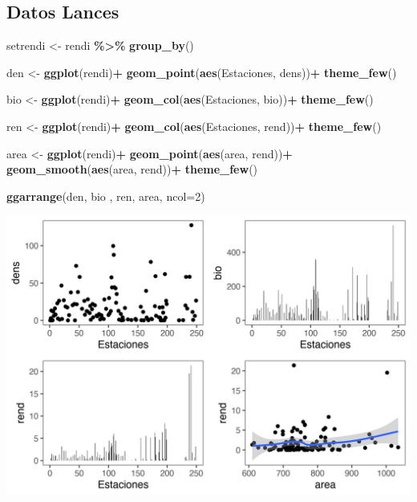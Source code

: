 \documentclass[
]{article}
\newenvironment{Shaded}{\begin{snugshade}}{\end{snugshade}}
\newcommand{\AttributeTok}[1]{\textcolor[rgb]{0.13,0.29,0.53}{#1}}
\newcommand{\DecValTok}[1]{\textcolor[rgb]{0.00,0.00,0.81}{#1}}
\newcommand{\FunctionTok}[1]{\textcolor[rgb]{0.13,0.29,0.53}{\textbf{#1}}}
\newcommand{\NormalTok}[1]{#1}
\newcommand{\OtherTok}[1]{\textcolor[rgb]{0.56,0.35,0.01}{#1}}
\newcommand{\SpecialCharTok}[1]{\textcolor[rgb]{0.81,0.36,0.00}{\textbf{#1}}}
\begin{document}
\hypertarget{datos-lances}{%
\subsection{Datos Lances}\label{datos-lances}}

\begin{Shaded}
\begin{Highlighting}[]
\NormalTok{setrendi }\OtherTok{\textless{}{-}}\NormalTok{ rendi }\SpecialCharTok{\%\textgreater{}\%} 
  \FunctionTok{group\_by}\NormalTok{()}

\NormalTok{den }\OtherTok{\textless{}{-}} \FunctionTok{ggplot}\NormalTok{(rendi)}\SpecialCharTok{+}
  \FunctionTok{geom\_point}\NormalTok{(}\FunctionTok{aes}\NormalTok{(Estaciones, dens))}\SpecialCharTok{+}
  \FunctionTok{theme\_few}\NormalTok{()}

\NormalTok{bio }\OtherTok{\textless{}{-}} \FunctionTok{ggplot}\NormalTok{(rendi)}\SpecialCharTok{+}
  \FunctionTok{geom\_col}\NormalTok{(}\FunctionTok{aes}\NormalTok{(Estaciones, bio))}\SpecialCharTok{+}
  \FunctionTok{theme\_few}\NormalTok{()}

\NormalTok{ren }\OtherTok{\textless{}{-}} \FunctionTok{ggplot}\NormalTok{(rendi)}\SpecialCharTok{+}
  \FunctionTok{geom\_col}\NormalTok{(}\FunctionTok{aes}\NormalTok{(Estaciones, rend))}\SpecialCharTok{+}
  \FunctionTok{theme\_few}\NormalTok{()}

\NormalTok{area }\OtherTok{\textless{}{-}} \FunctionTok{ggplot}\NormalTok{(rendi)}\SpecialCharTok{+}
  \FunctionTok{geom\_point}\NormalTok{(}\FunctionTok{aes}\NormalTok{(area, rend))}\SpecialCharTok{+}
  \FunctionTok{geom\_smooth}\NormalTok{(}\FunctionTok{aes}\NormalTok{(area, rend))}\SpecialCharTok{+}
  \FunctionTok{theme\_few}\NormalTok{()}

\FunctionTok{ggarrange}\NormalTok{(den, bio , ren, area, }\AttributeTok{ncol=}\DecValTok{2}\NormalTok{)}
\end{Highlighting}
\end{Shaded}

\begin{center}\includegraphics{SAR_Method_files/figure-latex/unnamed-chunk-6-1} \end{center}
\end{document}
